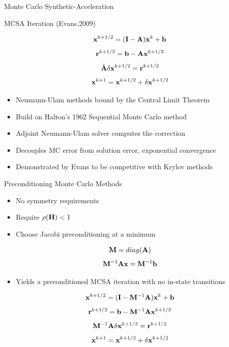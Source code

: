 \documentclass{beamer}
\begin{document}
\begin{frame}{Monte Carlo Synthetic-Acceleration}

  \begin{beamerboxesrounded}[upper=boxheadcolor,lower=boxbodycolor,shadow=true]
    {MCSA Iteration (Evans,2009)}

    \[
    \mathbf{x}^{k+1/2} = (\mathbf{I} - \mathbf{A})\mathbf{x}^k + \mathbf{b}
    \]
    \[
    \mathbf{r}^{k+1/2} = \mathbf{b} - \mathbf{A}\mathbf{x}^{k+1/2}
    \]
    \[
    \hat{\mathbf{A}}\delta\mathbf{x}^{k+1/2} = \mathbf{r}^{k+1/2}
    \]
    \[
    \mathbf{x}^{k+1} = \mathbf{x}^{k+1/2} + \delta \mathbf{x}^{k+1/2}
    \]

  \end{beamerboxesrounded}

  \begin{itemize}
  \item Neumann-Ulam methods bound by the Central Limit Theorem
  \item Build on Halton's 1962 Sequential Monte Carlo method
  \item Adjoint Neumann-Ulam solver computes the correction
  \item Decouples MC error from solution error, exponential convergence
  \item Demonstrated by Evans to be competitive with Krylov methods
  \end{itemize}

\end{frame}

\begin{frame}{Preconditioning Monte Carlo Methods}

  \begin{itemize}
  \item No symmetry requirements
  \item Require $\rho(\mathbf{H}) < 1$
  \item Choose Jacobi preconditioning at a minimum
  \end{itemize}

  \[
  \mathbf{M} = diag(\mathbf{A})
  \]
  \[
  \mathbf{M}^{-1}\mathbf{A}\mathbf{x} = \mathbf{M}^{-1}\mathbf{b}
  \]
  
  \begin{itemize}
  \item Yields a preconditioned MCSA iteration with no in-state
    transitions
  \end{itemize}

  \[
  \mathbf{x}^{k+1/2} = (\mathbf{I} - \mathbf{M}^{-1}\mathbf{A})\mathbf{x}^k + \mathbf{b}
  \]
  \[
  \mathbf{r}^{k+1/2} = \mathbf{b} - \mathbf{M}^{-1}\mathbf{A}\mathbf{x}^{k+1/2}
  \]
  \[
  \mathbf{M}^{-1}\mathbf{A}\delta\mathbf{x}^{k+1/2} = \mathbf{r}^{k+1/2}
  \]
  \[
  \mathbf{x}^{k+1} = \mathbf{x}^{k+1/2} + \delta \mathbf{x}^{k+1/2}
  \]

\end{frame}
\end{document}
